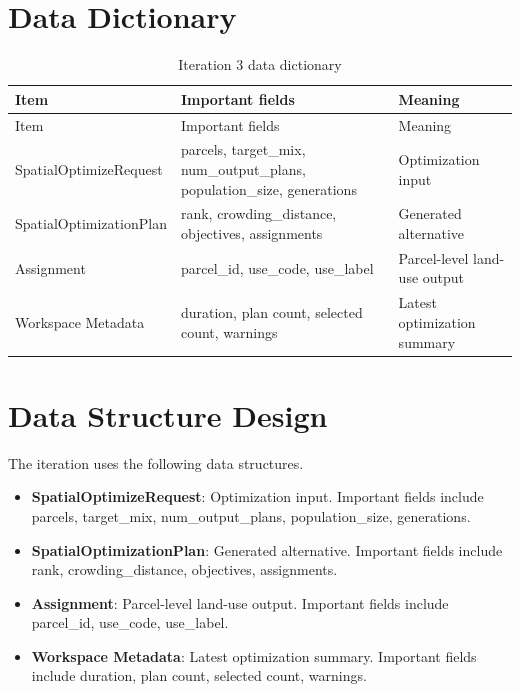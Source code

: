 \documentclass[12pt,a4paper,oneside]{report}
\begin{document}
\section{Data Dictionary}

\begin{longtable}{p{}p{}p{}}
\caption{Iteration 3 data dictionary}\label{tab:iter8dict}\\
\toprule
Item & Important fields & Meaning \\
\midrule
\endfirsthead
\toprule
Item & Important fields & Meaning \\
\midrule
\endhead

SpatialOptimizeRequest & parcels, target\_mix, num\_output\_plans, population\_size, generations & Optimization input \\

SpatialOptimizationPlan & rank, crowding\_distance, objectives, assignments & Generated alternative \\

Assignment & parcel\_id, use\_code, use\_label & Parcel-level land-use output \\

Workspace Metadata & duration, plan count, selected count, warnings & Latest optimization summary \\

\bottomrule
\end{longtable}

\section{Data Structure Design}
The iteration uses the following data structures.
\begin{itemize}

\item \textbf{SpatialOptimizeRequest}: Optimization input. Important fields include parcels, target\_mix, num\_output\_plans, population\_size, generations.

\item \textbf{SpatialOptimizationPlan}: Generated alternative. Important fields include rank, crowding\_distance, objectives, assignments.

\item \textbf{Assignment}: Parcel-level land-use output. Important fields include parcel\_id, use\_code, use\_label.

\item \textbf{Workspace Metadata}: Latest optimization summary. Important fields include duration, plan count, selected count, warnings.

\end{itemize}
\end{document}
